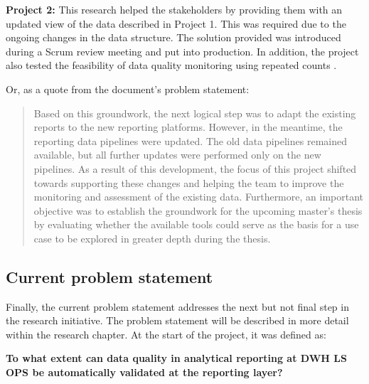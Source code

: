 \textbf{Project 2: }This research helped the stakeholders by providing them with an updated view of the data described in Project 1. This was required due to the ongoing changes in the data structure. The solution provided was introduced during a Scrum review meeting and put into production. In addition, the project also tested the feasibility of data quality monitoring using repeated counts \cite{Roccaro2026_Project2}.


Or, as a quote from the document's problem statement:

\begin{quote}
Based on this groundwork, the next logical step was to adapt the existing reports to the new reporting platforms. However, in the meantime, the reporting data pipelines were updated. The old data pipelines remained available, but all further updates were performed only on the new pipelines. As a result of this development, the focus of this project shifted towards supporting these changes and helping the team to improve the monitoring and assessment of the existing data. Furthermore, an important objective was to establish the groundwork for the upcoming master's thesis by evaluating whether the available tools could serve as the basis for a use case to be explored in greater depth during the thesis.
\end{quote}


\subsection*{Current problem statement}

Finally, the current problem statement addresses the next but not final step in the research initiative. The problem statement will be described in more detail within the research chapter. At the start of the project, it was defined as:

\textbf{To what extent can data quality in analytical reporting at DWH LS OPS be automatically validated at the reporting layer?}


